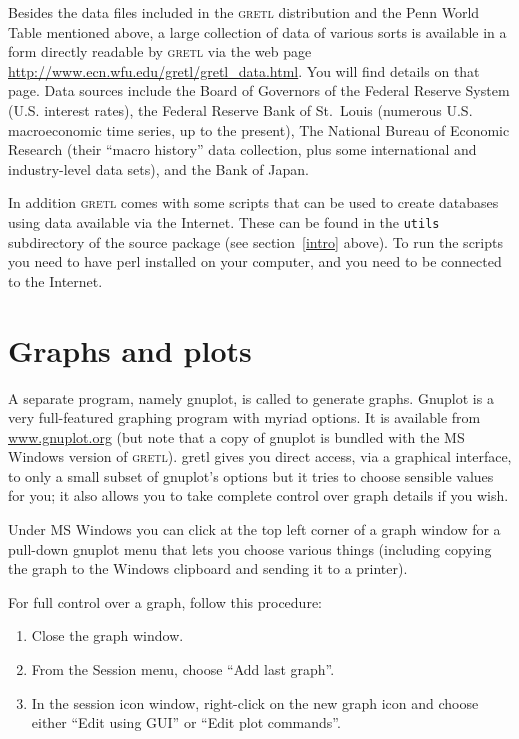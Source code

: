 \documentclass{article}
\begin{document}
Besides the data files included in the \textsc{gretl} distribution and
the Penn World Table mentioned above, a large collection of data of
various sorts is available in a form directly readable by
\textsc{gretl} via the web page
\url{http://www.ecn.wfu.edu/gretl/gretl_data.html}.
You will find details on that page.  Data sources include the Board of
Governors of the Federal Reserve System (U.S. interest rates), the
Federal Reserve Bank of St.\ Louis (numerous U.S. macroeconomic time
series, up to the present), The National Bureau of Economic Research
(their ``macro history'' data collection, plus some international and
industry-level data sets), and the Bank of Japan.

In addition \textsc{gretl} comes with some scripts that can be used to
create databases using data available via the Internet. These can be
found in the \texttt{utils} subdirectory of the source package (see
section~\ref{intro} above). To run the scripts you need to have
\textsf{perl} installed on your computer, and you need to be connected
to the Internet.

\section{Graphs and plots}
\label{graph}

A separate program, namely gnuplot, is called to generate graphs.
Gnuplot is a very full-featured graphing program with myriad options.
It is available from \url{www.gnuplot.org} (but note that a copy of
gnuplot is bundled with the MS Windows version of \textsc{gretl}).
\textsf{gretl} gives you direct access, via a graphical interface, to
only a small subset of gnuplot's options but it tries to choose
sensible values for you; it also allows you to take complete control
over graph details if you wish.

Under MS Windows you can click at the top left corner of a graph
window for a pull-down gnuplot menu that lets you choose various
things (including copying the graph to the Windows clipboard and
sending it to a printer).

For full control over a graph, follow this procedure:

\begin{enumerate}
\item Close the graph window.
\item From the Session menu, choose ``Add last graph''.
\item In the session icon window, right-click on the new graph icon
  and choose either ``Edit using GUI'' or ``Edit plot commands''.
\end{enumerate}
\end{document}
